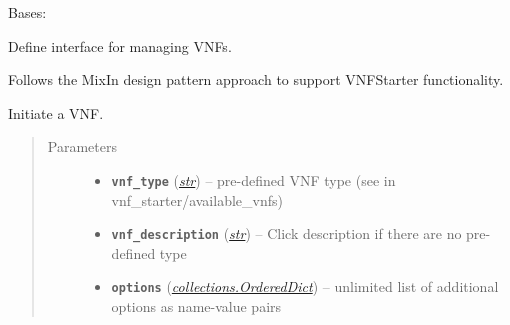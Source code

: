 \documentclass[letterpaper,10pt,english]{sphinxmanual}
\begin{document}
\begin{fulllineitems}
\label{util/adapter:escape.util.adapter.VNFStarterAPI}
Bases: \href{https://docs.python.org/2.7/library/functions.html\#object}{}

Define interface for managing VNFs.







Follows the MixIn design pattern approach to support VNFStarter functionality.

\begin{fulllineitems}
\label{util/adapter:escape.util.adapter.VNFStarterAPI.__init__}
\end{fulllineitems}


\begin{fulllineitems}
\label{util/adapter:escape.util.adapter.VNFStarterAPI.initiateVNF}
Initiate a VNF.
\begin{quote}\begin{description}
\item[{Parameters}] \leavevmode\begin{itemize}
\item {} 
\textbf{\texttt{vnf\_type}} (\href{https://docs.python.org/2.7/library/functions.html\#str}{\emph{str}}) -- pre-defined VNF type (see in vnf\_starter/available\_vnfs)

\item {} 
\textbf{\texttt{vnf\_description}} (\href{https://docs.python.org/2.7/library/functions.html\#str}{\emph{str}}) -- Click description if there are no pre-defined type

\item {} 
\textbf{\texttt{options}} (\href{https://docs.python.org/2.7/library/collections.html\#collections.OrderedDict}{\emph{collections.OrderedDict}}) -- unlimited list of additional options as name-value pairs

\end{itemize}

\end{description}\end{quote}


\end{fulllineitems}
\end{fulllineitems}
\end{document}
